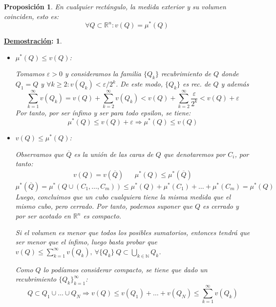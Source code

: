 \documentclass[10pt,a4paper,openright]{book}
\theoremstyle{break}
\newtheorem*{prop}{Proposición}
\newtheorem*{demo}{\underline{Demostración}:}
\begin{document}
\begin{prop}
En cualquier rectángulo, la medida exterior y su volumen coinciden, esto es:
$$\forall Q \subset \mathbb{R}^n : v\left( Q \right) = \mu^{*}\left( Q \right)$$
\end{prop}
\begin{demo}
    \begin{itemize}
        \item $ \mu^*\left( Q \right) \le v\left( Q \right) $:
        
        Tomamos $\varepsilon > 0$ y consideramos la familia $ \{Q_k\}$ recubrimiento de $Q$ donde $Q_1 = Q$ y $\forall k \geq 2 : v(Q_k) < \varepsilon/2^{k}$. De este modo, $\{Q_k\} $ es rec. de $Q$ y además
$$\sum_{k=1}^{\infty} v\left( Q_k \right) = v\left( Q \right) + \sum_{k=2}^{\infty} v\left( Q_k \right) < v\left( Q \right) + \sum_{k=2}^{\infty} \frac{\varepsilon}{2^{k}} < v\left( Q \right) + \varepsilon$$
		Por tanto, por ser ínfimo y ser para todo epsilon, se tiene:
		$$\mu^*\left( Q \right) \le v\left( Q \right) + \varepsilon \Rightarrow \mu^*\left( Q \right) \le v\left( Q \right)$$
        \item $v\left( Q \right) \le \mu^*\left( Q \right)$:
        
        Observamos que $ \overline{Q}$ es la unión de las caras de $Q$ que denotaremos por $C_i$, por tanto:
        \begin{align*}
        v\left( Q \right) = v\left( \overline{Q} \right)  && \mu^{*}\left( Q \right) \le \mu^{*}\left( \overline{Q} \right)
        \end{align*}
        $$\mu^{*}\left( \overline{Q} \right) = \mu^{*}\left( Q \cup \left( C_1, \ldots, C_m \right)  \right) \le \mu^{*}\left( Q \right) + \mu^{*}\left( C_1 \right) + \ldots + \mu^{*}\left( C_m \right) = \mu^{*}\left( Q \right)$$
        Luego, concluimos que un cubo cualquiera tiene la misma medida que el mismo cubo, pero cerrado. Por tanto, podemos suponer que $Q$ es cerrado y por ser acotado en $\mathbb{R}^n$ es compacto. 
        
Si el volumen es menor que todos los posibles sumatorios, entonces tendrá que ser menor que el ínfimo, luego basta probar que $v\left( Q \right) \le \sum_{k=1}^{\infty} v\left( Q_k \right), \ \forall \{Q_k\} \ Q \subset \bigcup_{k \in \mathbb{N}} Q_k $.

Como $Q$ lo podíamos considerar compacto, se tiene que dado un recubrimiento $\{Q_k\}_{k=1}^{\infty}$:
$$Q \subset Q_1 \cup \ldots \cup Q_N \Rightarrow v\left( Q \right) \le v\left( Q_1 \right) +\ldots+v\left( Q_N \right) \le \sum_{k=1}^{\infty} v\left( Q_k \right)$$
\end{itemize}
\end{demo}
\end{document}
